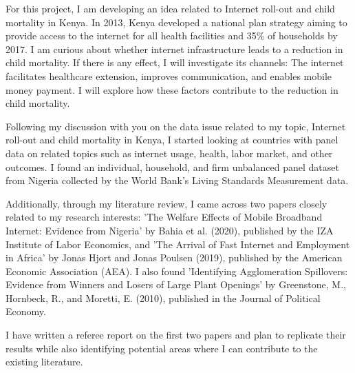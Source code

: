 \documentclass{article}
\begin{document}
For this project, I am developing an idea related to Internet roll-out and child mortality in Kenya. In 2013, Kenya developed a national plan strategy aiming to provide access to the internet for all health facilities and 35\% of households by 2017. I am curious about whether internet infrastructure leads to a reduction in child mortality. If there is any effect, I will investigate its channels: The internet facilitates healthcare extension, improves communication, and enables mobile money payment. I will explore how these factors contribute to the reduction in child mortality.

Following my discussion with you on the data issue related to my topic, Internet roll-out and child mortality in Kenya, I started looking at countries with panel data on related topics such as internet usage, health, labor market, and other outcomes. I found an individual, household, and firm unbalanced panel dataset from Nigeria collected by the World Bank's Living Standards Measurement data.

Additionally, through my literature review, I came across two papers closely related to my research interests: 'The Welfare Effects of Mobile Broadband Internet: Evidence from Nigeria' by Bahia et al. (2020), published by the IZA Institute of Labor Economics, and 'The Arrival of Fast Internet and Employment in Africa' by Jonas Hjort and Jonas Poulsen (2019), published by the American Economic Association (AEA). I also found 'Identifying Agglomeration Spillovers: Evidence from Winners and Losers of Large Plant Openings' by Greenstone, M., Hornbeck, R., and Moretti, E. (2010), published in the Journal of Political Economy.

I have written a referee report on the first two papers and plan to replicate their results while also identifying potential areas where I can contribute to the existing literature.
\end{document}
